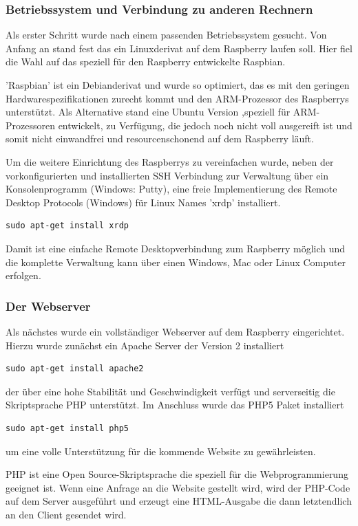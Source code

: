 \documentclass[11pt,a4paper]{article} %
\begin{document}
\subsubsection{Betriebssystem und Verbindung zu anderen Rechnern}
Als erster Schritt wurde nach einem passenden Betriebssystem gesucht. Von Anfang an stand fest das ein Linuxderivat auf dem Raspberry laufen soll. Hier fiel die Wahl auf das speziell für den Raspberry entwickelte Raspbian.
\par
'Raspbian' ist ein Debianderivat und wurde so optimiert, das es mit den geringen Hardwarespezifikationen zurecht kommt und den ARM-Prozessor des Raspberrys unterstützt. Als Alternative stand eine Ubuntu Version ,speziell für ARM-Prozessoren entwickelt, zu Verfügung, die jedoch noch nicht voll ausgereift ist und somit nicht einwandfrei und resourcenschonend auf dem Raspberry läuft.
\par
 Um die weitere Einrichtung des Raspberrys zu vereinfachen wurde, neben der vorkonfigurierten und installierten SSH Verbindung zur Verwaltung über ein Konsolenprogramm (Windows: Putty), eine freie Implementierung des Remote Desktop Protocols (Windows) für Linux Names 'xrdp' installiert. \cite{2}
\begin{frame}

\begin{lstlisting}
sudo apt-get install xrdp
\end{lstlisting}

\end{frame}
Damit ist eine einfache Remote Desktopverbindung zum Raspberry möglich und die komplette Verwaltung kann über einen Windows, Mac oder Linux Computer erfolgen. 
\par
\subsubsection{Der Webserver}
Als nächstes wurde ein vollständiger Webserver auf dem Raspberry eingerichtet. Hierzu wurde zunächst ein Apache Server der Version 2 installiert
\begin{frame}

\begin{lstlisting}
sudo apt-get install apache2
\end{lstlisting}

\end{frame}
 der über eine hohe Stabilität und Geschwindigkeit verfügt und serverseitig die Skriptsprache PHP unterstützt. Im Anschluss wurde das PHP5 Paket installiert
 \begin{frame}

\begin{lstlisting}
sudo apt-get install php5
\end{lstlisting}

\end{frame}
 um eine volle Unterstützung für die kommende Website zu gewährleisten.
 \par
 PHP ist eine Open Source-Skriptsprache die speziell für die Webprogrammierung geeignet ist. Wenn eine Anfrage an die Website gestellt wird, wird der PHP-Code auf dem Server ausgeführt und erzeugt eine HTML-Ausgabe die dann letztendlich an den Client gesendet wird.
 \cite{3}
\par
\end{document}
